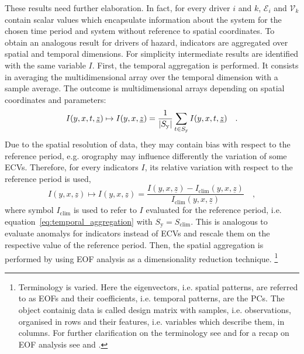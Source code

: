 These results need further elaboration. In fact, for every \gls{driver} $i$ and $k$, $\mathcal{E}_i$ and $\mathcal{V}_k$ contain scalar values which encapsulate information about the system for the chosen time period and system without reference to spatial coordinates. To obtain an analogous result for \glspl{driver} of \gls{hazard}, \glspl{indicator} are aggregated over spatial and temporal dimensions. For simplicity intermediate results are identified with the same variable $I$.
First, the temporal aggregation is performed. It consists in averaging the multidimensional array over the temporal dimension with a sample average. The outcome is multidimensional arrays depending on spatial coordinates and parameters:
\begin{equation}
  \label{eq:temporal_aggregation}
  I(y, x, t, \underline{z}) \mapsto I(y, x, \underline{z}) = \frac{1}{\lvert S_\text{y}\rvert} \sum_{t \in S_\text{y}} I(y, x, t, \underline{z})
  \quad .
\end{equation}
Due to the spatial resolution of data, they may contain bias with respect to the reference period, e.g. orography may influence differently the variation of some \glspl{ECV}. Therefore, for every \glspl{indicator} $I$, its relative variation with respect to the reference period is used,
\begin{equation}
  \label{eq:spatial_bias}
  I(y, x, \underline{z}) \mapsto I(y, x, \underline{z}) = \frac{I(y, x, \underline{z}) - I_\text{clim}(y, x, \underline{z})}{I_\text{clim}(y, x, \underline{z})}
  \quad ,
\end{equation}
where symbol $I_\text{clim}$ is used to refer to $I$ evaluated for the reference period, i.e. equation~\eqref{eq:temporal_aggregation} with $S_\text{y} = S_\text{clim}$. This is analogous to evaluate \glspl{anomaly} for \glspl{indicator} instead of \glspl{ECV} and rescale them on the respective value of the reference period.
Then, the spatial aggregation is performed by using \gls{EOF} analysis as a dimensionality reduction technique.%
\footnote{Terminology is varied. Here the eigenvectors, i.e. spatial patterns, are referred to as \glspl{EOF} and their coefficients, i.e. temporal patterns, are the \glspl{PC}. The object containig data is called design matrix with samples, i.e. observations, organised in rows and their features, i.e. variables which describe them, in columns. For further clarification on the terminology see \cite[626-627]{2019WilksStatisticalMethods} and for a recap on \gls{EOF} analysis see \cite[6502-6503]{2009MonahanEmpiricalOrthogonal} and \cite[1121-1122]{2007HannachiEmpiricalOrthogonal}.}
